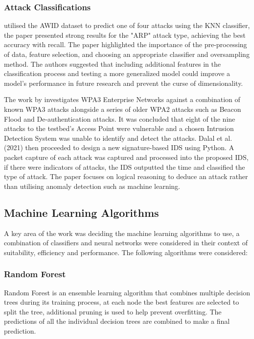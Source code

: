 \subsubsection*{Attack Classifications}

\cite{10.1007/978-3-030-98457-1_1} utilised the AWID dataset to predict one of four attacks using the KNN classifier, the paper presented strong results for the "ARP" attack type, achieving the best accuracy with recall. The paper highlighted the importance of the pre-processing of data, feature selection, and choosing an appropriate classifier and oversampling method. The authors suggested that including additional features in the classification process and testing a more generalized model could improve a model's performance in future research and prevent the curse of dimensionality.

\medskip
The work by \cite{DBLP:journals/corr/abs-2110-04259} investigates WPA3 Enterprise Networks against a combination of known WPA3 attacks alongside a series of older WPA2 attacks such as Beacon Flood and De-authentication attacks. It was concluded that eight of the nine attacks to the testbed's Access Point were vulnerable and a chosen Intrusion Detection System was unable to identify and detect the attacks. Dalal et al. (2021) then proceeded to design a new signature-based IDS using Python. A packet capture of each attack was captured and processed into the proposed IDS, if there were indicators of attacks, the IDS outputted the time and classified the type of attack. The paper focuses on logical reasoning to deduce an attack rather than utilising anomaly detection such as machine learning.
 
\subsection{Machine Learning Algorithms}

A key area of the work was deciding the machine learning algorithms to use, a combination of classifiers and neural networks were considered in their context of suitability, efficiency and performance. The following algorithms were considered:
\subsubsection{Random Forest}

Random Forest is an ensemble learning algorithm that combines multiple decision trees during its training process, at each node the best features are selected to split the tree, additional pruning is used to help prevent overfitting. The predictions of all the individual decision trees are combined to make a final prediction.

